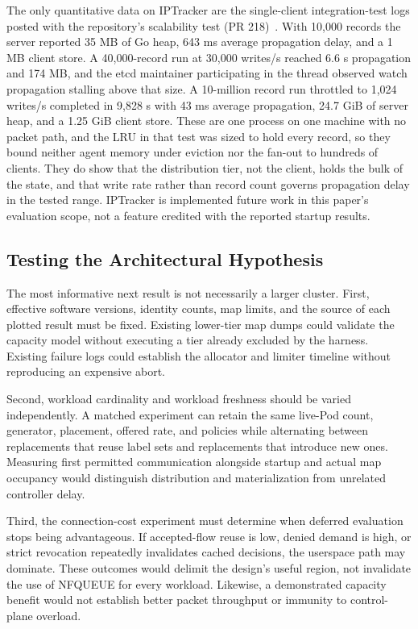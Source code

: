\documentclass[letterpaper,twocolumn,10pt]{article}
\begin{document}
The only quantitative data on IPTracker are the single-client
integration-test logs posted with the repository's scalability test
(PR 218)~\cite{iptracker218}. With 10,000 records the server reported
35 MB of Go heap, 643 ms average propagation delay, and a 1 MB client
store. A 40,000-record run at 30,000 writes/s reached 6.6 s propagation
and 174 MB, and the etcd maintainer participating in the thread
observed watch propagation stalling above that size. A 10-million
record run throttled to 1,024 writes/s completed in 9,828 s with 43 ms
average propagation, 24.7 GiB of server heap, and a 1.25 GiB client
store. These are one process on one machine with no packet path, and
the LRU in that test was sized to hold every record, so they bound
neither agent memory under eviction nor the fan-out to hundreds of
clients. They do show that the distribution tier, not the client,
holds the bulk of the state, and that write rate rather than record
count governs propagation delay in the tested range. IPTracker is
implemented future work in this paper's evaluation scope, not a
feature credited with the reported startup results.

\subsection{Testing the Architectural Hypothesis}
The most informative next result is not necessarily a larger cluster.
First, effective software versions, identity counts, map limits,
and the source of each plotted result must be fixed. Existing
lower-tier map dumps could validate the capacity model without
executing a tier already excluded by the harness. Existing failure
logs could establish the allocator and limiter timeline without
reproducing an expensive abort.

Second, workload cardinality and workload freshness should be varied
independently. A matched experiment can retain the same live-Pod count,
generator, placement, offered rate, and policies while alternating
between replacements that reuse label sets and replacements that
introduce new ones. Measuring first permitted communication alongside
startup and actual map occupancy would distinguish distribution and
materialization from unrelated controller delay.

Third, the connection-cost experiment must determine when deferred
evaluation stops being advantageous. If accepted-flow reuse is low,
denied demand is high, or strict revocation repeatedly invalidates
cached decisions, the userspace path may dominate. These outcomes
would delimit the design's useful region, not invalidate the use
of NFQUEUE for every workload. Likewise, a demonstrated capacity
benefit would not establish better packet throughput or immunity
to control-plane overload.
\end{document}
